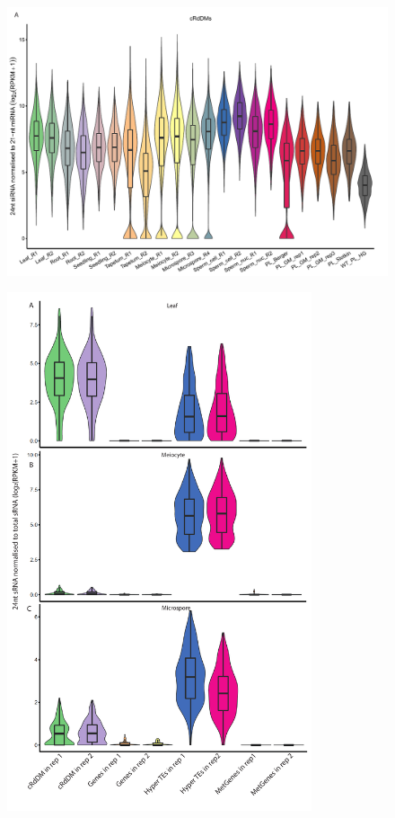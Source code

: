 \begin{figure}[htbp!] 
\centering    
    \includegraphics[width=1\textwidth]{Chapter2/Figs/Supps/FigureS7_miRNA_norm.pdf}
\caption{\textbf{}}
\label{fig:miRNA_norm}
\captionsetup{font=small}
    \caption*{}
\end{figure}

\begin{figure}[htbp!] 
\centering    
    \includegraphics[width=0.8\textwidth]{Chapter2/Figs/Supps/FigureS8_boxplots_meiocyte_microspore.pdf}
\caption{\textbf{}}
\label{fig:boxplot-MCMS}
\captionsetup{font=small}
    \caption*{}
\end{figure}

